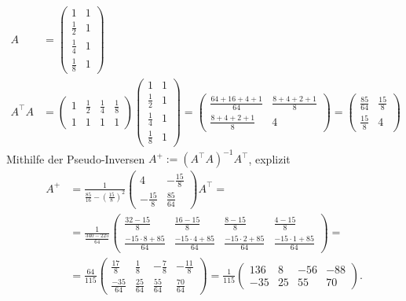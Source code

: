 \documentclass[english, parskip=full]{scrartcl}
\newcommand{\kla}{}
\begin{document}
\begin{align}
A &= \begin{pmatrix}
1 & 1 \\ \frac{1}{2} & 1 \\ \frac{1}{4} & 1 \\ \frac{1}{8} & 1
\end{pmatrix}\\
A^\top A &= \begin{pmatrix}
1 & \frac{1}{2} & \frac{1}{4} & \frac{1}{8} \\
1 & 1 & 1 & 1 
\end{pmatrix}\begin{pmatrix}
1 & 1 \\ \frac{1}{2} & 1 \\ \frac{1}{4} & 1 \\ \frac{1}{8} & 1
\end{pmatrix} = \begin{pmatrix}
\frac{64+16+4+1}{64} & \frac{8+4+2+1}{8} \\ \frac{8+4+2+1}{8} & 4
\end{pmatrix} = \begin{pmatrix}
\frac{85}{64} & \frac{15}{8} \\ \frac{15}{8} & 4
\end{pmatrix}
\end{align}
Mithilfe der Pseudo-Inversen $A^+ := (A^\top A)^{-1}A^\top$, explizit
\begin{align}
A^+ &= \frac{1}{\frac{85}{16} - \kla\left( \frac{15}{8} \right)^2} \begin{pmatrix}
4 & -\frac{15}{8} \\ -\frac{15}{8} & \frac{85}{64}
\end{pmatrix} A^\top = \\
&= \frac{1}{\frac{340 - 225}{64}} \begin{pmatrix}
\frac{32 - 15}{8} & \frac{16 - 15}{8} & \frac{8 - 15}{8} & \frac{4 - 15}{8} \\
\frac{-15\cdot 8 + 85}{64} & \frac{-15\cdot 4 + 85}{64} & \frac{-15\cdot 2 + 85}{64} & \frac{-15\cdot 1 + 85}{64}
\end{pmatrix} = \\
&= \frac{64}{115} \begin{pmatrix}
\frac{17}{8} & \frac{1}{8} & -\frac{7}{8} & -\frac{11}{8} \\
\frac{-35}{64} & \frac{25}{64} & \frac{55}{64} & \frac{70}{64}
\end{pmatrix} = \frac{1}{115} \begin{pmatrix}
136 & 8 & - 56 & -88 \\
-35 & 25 & 55 & 70
\end{pmatrix}.
\end{align} 
\end{document}
